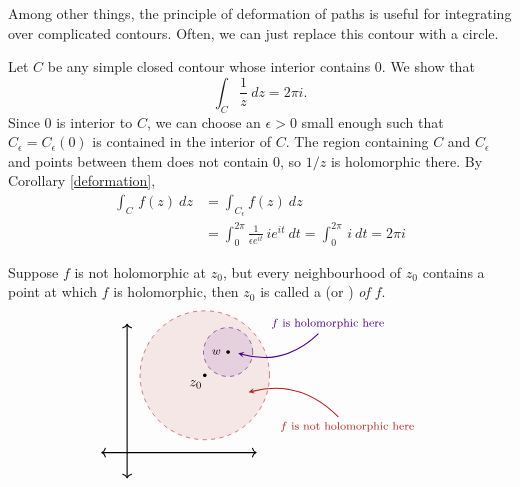 
Among other things, the principle of deformation of paths is useful for integrating over complicated contours. Often, we can just replace this contour with a circle.
\begin{example}
Let $C$ be any simple closed contour whose interior contains $0$. We show that
\[\int_C\frac{1}{z}\ dz = 2\pi i.\]
Since $0$ is interior to $C$, we can choose an $\epsilon > 0$ small enough such that $C_\epsilon = C_\epsilon(0)$ is contained in the interior of $C$. The region containing $C$ and $C_\epsilon$ and points between them does not contain $0$, so $1/z$ is holomorphic there. By Corollary \ref{deformation},
\begin{align*}
\int_C\,f(z)\ dz &= \int_{C_\epsilon}f(z)\ dz\\[1em]
 &= \int_0^{2\pi}\frac{1}{\epsilon e^{it}}\,ie^{it}\ dt = \int_0^{2\pi}\,i\ dt = 2\pi i
\end{align*}
\end{example}

\vspace*{1em}

\begin{definition}[Singularities]
Suppose $f$ is not holomorphic at $z_0$, but every neighbourhood of $z_0$ contains a point at which $f$ is holomorphic, then $z_0$ is called a  (or ) \emph{of $f$}.\\[1em]
\[\begin{tikzpicture}[scale=0.65]
    \draw[<->,thick] (-1,0)--(5,0);
	\draw[<->,thick] (0,-1)--(0,5);
	\filldraw[firebrick,fill opacity=1/10,dashed](3,3) circle (2.5);
    \fill (3,3) circle (2pt);
    \node[] at (2.65,2.65) {$z_0$};
	\filldraw[indigo,fill opacity=1/10,dashed](3.9,3.9) circle (0.95);
    \fill (3.9,3.9) circle (2pt);
    \node[] at (3.45,3.9) {\footnotesize$w$};
    \node[] (3) at (8.5,1) {\footnotesize\color{firebrick}$f$ is not holomorphic here};
    \node[] (1) at (7.75,5) {\footnotesize\color{indigo}$f$ is holomorphic here};
    \node[] (2) at (4.1,3.9) {};
    \node[] (4) at (4.5,2.3) {};
	\path[every node/.style={font=\sffamily\small},<-,>=stealth, thick,indigo]
    (2) edge[bend right] node [left] {} (1);
    \path[every node/.style={font=\sffamily\small},->,>=stealth, thick,firebrick]
    (3) edge[bend right] node [left] {} (4);
  \end{tikzpicture}\]
\end{definition}


